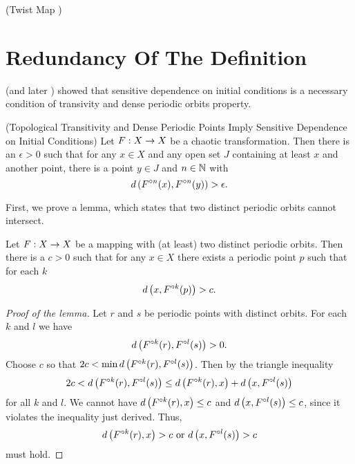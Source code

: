 \documentclass[12pt,draft,twoside]{book}
\begin{document}
  \begin{example}
    (Twist Map \citep{wiggins})
  \end{example}

\section{Redundancy Of The Definition}
\citet{silverman} (and later \citet{banks}) showed that sensitive dependence on initial conditions is a necessary condition of transivity and dense periodic orbits property.

\begin{theorem}
  (Topological Transitivity and Dense Periodic Points Imply Sensitive Dependence on Initial Conditions)
  Let $F: X\rightarrow X$ be a chaotic transformation. Then there is an $\epsilon > 0$ such that
  for any $x\in X$ and any open set $J$ containing at least $x$ and another point, there is
  a point $y\in J$ and $n\in \mathbb{N}$ with
  \begin{equation*}
    d\left( F^{\circ n}(x),F^{\circ n}(y) \right) > \epsilon.
  \end{equation*}
  \label{thm:silverman}
\end{theorem}
First, we prove a lemma, which states that two distinct periodic orbits cannot intersect.
\begin{lemma}
  Let $F: X\rightarrow X$ be a mapping with (at least) two distinct periodic orbits.
  Then there is a $c > 0$ such that for any $x\in X$ there exists a periodic
  point $p$ such that for each $k$
  \begin{equation*}
    d\left( x, F^{\circ k}(p) \right) > c.
  \end{equation*}
  \label{lem:dev1}
  \begin{proof}[Proof of the lemma]
    Let $r$ and $s$ be periodic points with distinct orbits. For each $k$ and $l$ we have
    \begin{equation*}
      d\left( F^{\circ k}(r), F^{\circ l}(s) \right) > 0.
    \end{equation*}
    Choose $c$ so that $2c < \min d\left( F^{\circ k}(r),F^{\circ l}(s) \right)$.
    Then by the triangle inequality
    \begin{equation*}
      2c < d\left( F^{\circ k}(r),F^{\circ l}(s) \right) \leq d\left( F^{\circ k}(r),x \right) + d\left( x,F^{\circ l}(s) \right)
    \end{equation*}
    for all $k$ and $l$.
    We cannot have $d\left( F^{\circ k}(r),x \right) \leq c$ and $d\left( x,F^{\circ l}(s) \right) \leq c$, since it violates the inequality just derived.
    Thus,
    \begin{equation*}
      d\left( F^{\circ k}(r),x \right) > c \mbox{ or } d\left( x,F^{\circ l}(s) \right) > c
    \end{equation*}
    must hold.
  \end{proof}
\end{lemma}
\end{document}

